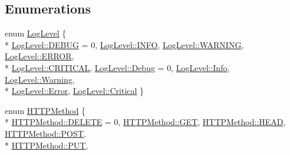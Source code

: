 \subsection*{Enumerations}
\begin{DoxyCompactItemize}
\item 
enum \hyperlink{namespacecrow_ad07dc32e163caa516aa1225a1ec4afe4}{Log\-Level} \{ \\*
\hyperlink{namespacecrow_ad07dc32e163caa516aa1225a1ec4afe4adc30ec20708ef7b0f641ef78b7880a15}{Log\-Level\-::\-D\-E\-B\-U\-G} = 0, 
\hyperlink{namespacecrow_ad07dc32e163caa516aa1225a1ec4afe4a551b723eafd6a31d444fcb2f5920fbd3}{Log\-Level\-::\-I\-N\-F\-O}, 
\hyperlink{namespacecrow_ad07dc32e163caa516aa1225a1ec4afe4a059e9861e0400dfbe05c98a841f3f96b}{Log\-Level\-::\-W\-A\-R\-N\-I\-N\-G}, 
\hyperlink{namespacecrow_ad07dc32e163caa516aa1225a1ec4afe4abb1ca97ec761fc37101737ba0aa2e7c5}{Log\-Level\-::\-E\-R\-R\-O\-R}, 
\\*
\hyperlink{namespacecrow_ad07dc32e163caa516aa1225a1ec4afe4a99cd1c61610c76a57cb8d10d6df6b870}{Log\-Level\-::\-C\-R\-I\-T\-I\-C\-A\-L}, 
\hyperlink{namespacecrow_ad07dc32e163caa516aa1225a1ec4afe4aa603905470e2a5b8c13e96b579ef0dba}{Log\-Level\-::\-Debug} = 0, 
\hyperlink{namespacecrow_ad07dc32e163caa516aa1225a1ec4afe4a4059b0251f66a18cb56f544728796875}{Log\-Level\-::\-Info}, 
\hyperlink{namespacecrow_ad07dc32e163caa516aa1225a1ec4afe4a0eaadb4fcb48a0a0ed7bc9868be9fbaa}{Log\-Level\-::\-Warning}, 
\\*
\hyperlink{namespacecrow_ad07dc32e163caa516aa1225a1ec4afe4a902b0d55fddef6f8d651fe1035b7d4bd}{Log\-Level\-::\-Error}, 
\hyperlink{namespacecrow_ad07dc32e163caa516aa1225a1ec4afe4a278d01e5af56273bae1bb99a98b370cd}{Log\-Level\-::\-Critical}
 \}
\item 
enum \hyperlink{namespacecrow_a02d34072d2b3415aee5e7287edd06ae1}{H\-T\-T\-P\-Method} \{ \\*
\hyperlink{namespacecrow_a02d34072d2b3415aee5e7287edd06ae1a32f68a60cef40faedbc6af20298c1a1e}{H\-T\-T\-P\-Method\-::\-D\-E\-L\-E\-T\-E} = 0, 
\hyperlink{namespacecrow_a02d34072d2b3415aee5e7287edd06ae1a7528035a93ee69cedb1dbddb2f0bfcc8}{H\-T\-T\-P\-Method\-::\-G\-E\-T}, 
\hyperlink{namespacecrow_a02d34072d2b3415aee5e7287edd06ae1ae15e216fc1c639f787b1231ecdfa1bf8}{H\-T\-T\-P\-Method\-::\-H\-E\-A\-D}, 
\hyperlink{namespacecrow_a02d34072d2b3415aee5e7287edd06ae1aa02439ec229d8be0e74b0c1602392310}{H\-T\-T\-P\-Method\-::\-P\-O\-S\-T}, 
\\*
\hyperlink{namespacecrow_a02d34072d2b3415aee5e7287edd06ae1a3e75383a5992a6d15fb81e872e46e256}{H\-T\-T\-P\-Method\-::\-P\-U\-T}, 

\end{DoxyCompactItemize}
